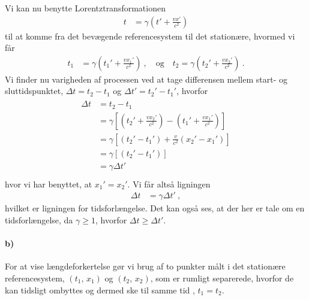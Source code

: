 \documentclass[../main.tex]{subfiles}
\begin{document}
Vi kan nu benytte Lorentztransformationen
\begin{align}
    t &= \gamma \left( t' + \frac{vx'}{c^2} \right)
\end{align}
til at komme fra det bevægende referencesystem til det stationære, hvormed vi får
\begin{align}
    t_1 &= \gamma \left( t_1' + \frac{v x_1'}{c^2} \right) \: ,
        \quad \text{og} \quad
    t_2 = \gamma \left( t_2' + \frac{v x_2'}{c^2} \right) \: .
\end{align}
Vi finder nu varigheden af processen ved at tage differensen mellem start- og sluttidspunktet, $\Delta t = t_2 - t_1$ og $\Delta t' = t_2' - t_1'$, hvorfor
\begin{align}
\begin{split}
    \Delta t &= t_2 - t_1 \\
        &= \gamma \left[ \left( t_2' + \frac{v x_2'}{c^2} \right) - \left( t_1' + \frac{v x_1'}{c^2} \right) \right] \\
        &= \gamma \left[ (t_2' - t_1') + \frac{v}{c^2} (x_2' - x_1') \right] \\
        &= \gamma \left[ (t_2' - t_1') \right] \\
        &= \gamma \Delta t' \\
\end{split}
\end{align}
hvor vi har benyttet, at $x_1' = x_2'$. Vi får altså ligningen
\begin{align}
    \Delta t &= \gamma \Delta t' \: ,
\end{align}
hvilket er ligningen for tidsforlængelse. Det kan også ses, at der her er tale om en tidsforlængelse, da $\gamma \geq 1$, hvorfor $\Delta t \geq \Delta t'$.



\paragraph{b)}

For at vise længdeforkertelse gør vi brug af to punkter målt i det stationære referencesystem, $(t_1,\, x_1)$ og $(t_2,\, x_2)$, som er rumligt separerede, hvorfor de kan tidsligt ombyttes og dermed ske til samme tid \cite[kapitel 11.2]{uggerhoj_specielRel}, $t_1 = t_2$.
\end{document}

